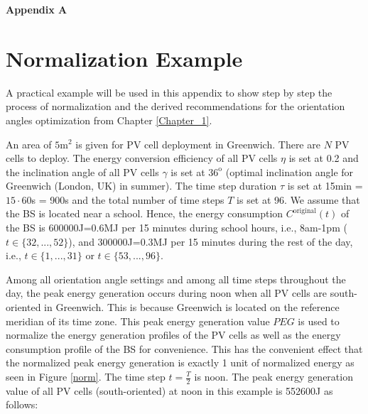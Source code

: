 \clearpage



\appendix

\begin{center}

\begin{center}{
\Huge \bf Appendix A}
\end{center}

\vspace{-1cm}
\section*{Normalization Example}
\end{center}


A practical example will be used in this appendix to show step by step the process of normalization and the derived recommendations for the orientation angles optimization from Chapter \ref{Chapter_1}. 


An area of $5 \mathrm{m^2}$ is given for PV cell deployment in Greenwich. There are $N$ PV cells to deploy. The energy conversion efficiency of all PV cells $\eta$ is set at 0.2 and the inclination angle of all PV cells $\gamma$ is set at $36^{\mathrm{o}}$ (optimal inclination angle for Greenwich (London, UK) in summer). The time step duration $\tau$ is set at 15min = $15\cdot60$s = 900s and the total number of time steps $T$ is set at 96. We assume that the BS is located near a school. Hence, the energy consumption $C^{\text{original}}(t)$ of the BS is 600000J=0.6MJ per 15 minutes during school hours, i.e., 8am-1pm ($t\in\{32,...,52\}$), and 300000J=0.3MJ per 15 minutes during the rest of the day, i.e., $t\in\{1,...,31\}$ or $t\in\{53,...,96\}$.



Among all orientation angle settings and among all time steps throughout the day, the peak energy generation occurs during noon when all PV cells are south-oriented in Greenwich. This is because Greenwich is located on the reference meridian of its time zone. This peak energy generation value $PEG$ is used to normalize the energy generation profiles of the PV cells as well as the energy consumption profile of the BS for convenience. This has the convenient effect that the normalized peak energy generation is exactly 1 unit of normalized energy as seen in Figure \ref{norm}.  The time step $t=\frac{T}{2}$ is noon. The peak energy generation value of all PV cells (south-oriented) at noon in this example is 552600J as follows:

